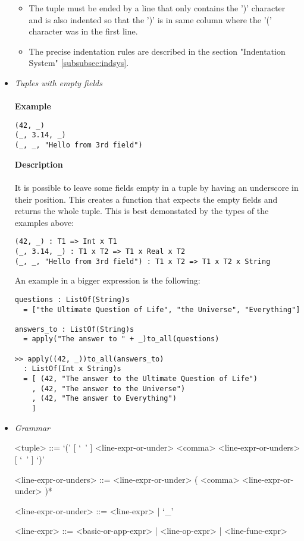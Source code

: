 \documentclass{article}
\begin{document}
\begin{itemize}
\begin{itemize}
\item
The tuple must be ended by a line that only contains the ')' character and is 
also indented so that the ')' is in same column where the '(' character was in
the first line.

\item
The precise indentation rules are described in the section
"Indentation System" \ref{subsubsec:indsys}.
\end{itemize}

\item \textit{Tuples with empty fields}
\\\\
\textbf{Example}
\begin{verbatim}
(42, _)
(_, 3.14, _)
(_, _, "Hello from 3rd field")
\end{verbatim}

\textbf{Description}\\\\
It is possible to leave some fields empty in a tuple by having an underscore in
their position. This creates a function that expects the empty fields
and returns the whole tuple. This is best demonstated by the types of the
examples above:
\begin{verbatim}
(42, _) : T1 => Int x T1
(_, 3.14, _) : T1 x T2 => T1 x Real x T2
(_, _, "Hello from 3rd field") : T1 x T2 => T1 x T2 x String
\end{verbatim}
An example in a bigger expression is the following:
\begin{verbatim}
questions : ListOf(String)s
  = ["the Ultimate Question of Life", "the Universe", "Everything"]

answers_to : ListOf(String)s
  = apply("The answer to " + _)to_all(questions)

>> apply((42, _))to_all(answers_to)
  : ListOf(Int x String)s
  = [ (42, "The answer to the Ultimate Question of Life")
    , (42, "The answer to the Universe")
    , (42, "The answer to Everything")
    ]
\end{verbatim}

\item \textit{Grammar}
\begin{grammar}
<tuple> ::=
`(' [ `\ ' ] <line-expr-or-under> <comma> <line-expr-or-unders> [ `\ ' ] `)'

<line-expr-or-unders> ::=
<line-expr-or-under> ( <comma> <line-expr-or-under> )*

<line-expr-or-under> ::= <line-expr> | `_'

<line-expr> ::= <basic-or-app-expr> | <line-op-expr> | <line-func-expr>


\end{grammar}
\end{itemize}
\end{document}
